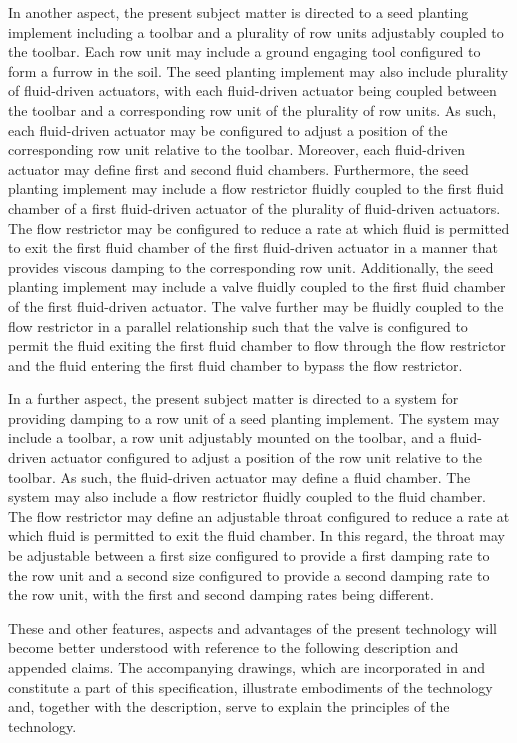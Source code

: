\documentclass[11pt,a4paper]{article}
\begin{document}
In another aspect, the present subject matter is directed to a seed planting implement including a toolbar and a plurality of row units adjustably coupled to the toolbar. Each row unit may include a ground engaging tool configured to form a furrow in the soil. The seed planting implement may also include plurality of fluid-driven actuators, with each fluid-driven actuator being coupled between the toolbar and a corresponding row unit of the plurality of row units. As such, each fluid-driven actuator may be configured to adjust a position of the corresponding row unit relative to the toolbar. Moreover, each fluid-driven actuator may define first and second fluid chambers. Furthermore, the seed planting implement may include a flow restrictor fluidly coupled to the first fluid chamber of a first fluid-driven actuator of the plurality of fluid-driven actuators. The flow restrictor may be configured to reduce a rate at which fluid is permitted to exit the first fluid chamber of the first fluid-driven actuator in a manner that provides viscous damping to the corresponding row unit. Additionally, the seed planting implement may include a valve fluidly coupled to the first fluid chamber of the first fluid-driven actuator. The valve further may be fluidly coupled to the flow restrictor in a parallel relationship such that the valve is configured to permit the fluid exiting the first fluid chamber to flow through the flow restrictor and the fluid entering the first fluid chamber to bypass the flow restrictor.

In a further aspect, the present subject matter is directed to a system for providing damping to a row unit of a seed planting implement. The system may include a toolbar, a row unit adjustably mounted on the toolbar, and a fluid-driven actuator configured to adjust a position of the row unit relative to the toolbar. As such, the fluid-driven actuator may define a fluid chamber. The system may also include a flow restrictor fluidly coupled to the fluid chamber. The flow restrictor may define an adjustable throat configured to reduce a rate at which fluid is permitted to exit the fluid chamber. In this regard, the throat may be adjustable between a first size configured to provide a first damping rate to the row unit and a second size configured to provide a second damping rate to the row unit, with the first and second damping rates being different.

These and other features, aspects and advantages of the present technology will become better understood with reference to the following description and appended claims. The accompanying drawings, which are incorporated in and constitute a part of this specification, illustrate embodiments of the technology and, together with the description, serve to explain the principles of the technology.
\end{document}
